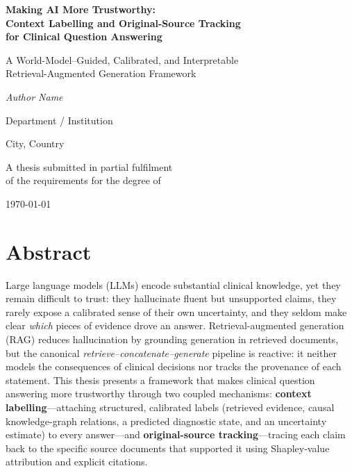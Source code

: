 \documentclass[11pt,a4paper]{report}
\begin{document}
\begin{titlepage}
\centering
\vspace*{1.5cm}
{\LARGE\bfseries Making AI More Trustworthy:\\[0.35em]
Context Labelling and Original-Source Tracking\\[0.35em]
for Clinical Question Answering\par}
\vspace{1.4cm}
{\large A World-Model--Guided, Calibrated, and Interpretable\\
Retrieval-Augmented Generation Framework\par}
\vspace{2.2cm}
{\large\itshape Author Name\par}
\vspace{0.4cm}
{\normalsize Department / Institution\par}
{\normalsize City, Country\par}
\vspace{2.4cm}
{\normalsize A thesis submitted in partial fulfilment\\
of the requirements for the degree of\\
[Degree Title]\par}
\vfill
{\normalsize \today\par}
\end{titlepage}

\chapter*{Abstract}

Large language models (LLMs) encode substantial clinical knowledge, yet they
remain difficult to trust: they hallucinate fluent but unsupported claims, they
rarely expose a calibrated sense of their own uncertainty, and they seldom make
clear \emph{which} pieces of evidence drove an answer. Retrieval-augmented
generation (RAG) reduces hallucination by grounding generation in retrieved
documents, but the canonical \emph{retrieve--concatenate--generate} pipeline is
reactive: it neither models the consequences of clinical decisions nor tracks
the provenance of each statement. This thesis presents a framework that makes
clinical question answering more trustworthy through two coupled mechanisms:
\textbf{context labelling}---attaching structured, calibrated labels (retrieved
evidence, causal knowledge-graph relations, a predicted diagnostic state, and an
uncertainty estimate) to every answer---and \textbf{original-source
tracking}---tracing each claim back to the specific source documents that
supported it using Shapley-value attribution and explicit citations.
\end{document}
